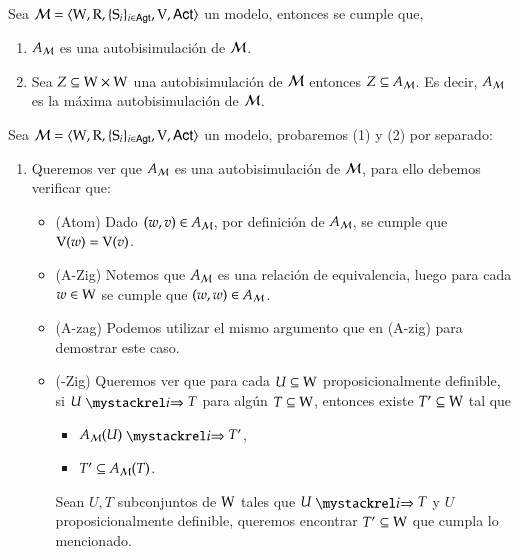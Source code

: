 \begin{teorema}
    Sea $\mathcal{M}=\langle \mathrm{W},\mathrm{R},\{ \mathrm{S}_i \}_{i \in {\rm \sf Agt}},\mathrm{V},{\rm \sf Act} \rangle$ un modelo, entonces se cumple que,
    \begin{enumerate}
        \item $A_{\mathcal{M}}$ es una autobisimulación de $\mathcal{M}$.
        \item Sea $Z \subseteq \mathrm{W} \times \mathrm{W}$ una autobisimulación de $\mathcal{M}$ entonces $Z \subseteq A_{\mathcal{M}}$. Es decir, $A_{\mathcal{M}} $ es la máxima autobisimulación de $\mathcal{M}$. 
    \end{enumerate}
\end{teorema}

\begin{demostracion}
    Sea $\mathcal{M}=\langle \mathrm{W},\mathrm{R},\{ \mathrm{S}_i \}_{i \in {\rm \sf Agt}},\mathrm{V},{\rm \sf Act} \rangle$ un modelo, probaremos (1) y (2) por separado:

    \begin{enumerate}
        \item Queremos ver que $A_{\mathcal{M}}$ es una autobisimulación de $\mathcal{M}$, para ello debemos verificar que:
        \begin{itemize}
            \item (Atom) Dado $(w,v) \in A_{\mathcal{M}}$, por definición de $A_{\mathcal{M}}$, se cumple que $\mathrm{V}(w) = \mathrm{V}(v)$.
            \item (A-Zig) Notemos que $A_{\mathcal{M}}$ es una relación de equivalencia, luego para cada $w\in \mathrm{W}$ se cumple que $(w,w) \in A_{\mathcal{M}}$.
            \item (A-zag) Podemos utilizar el mismo argumento que en (A-zig) para demostrar este caso.
            \item (\KHilogic-Zig) Queremos ver que para cada $U \subseteq \mathrm{W}$ proposicionalmente definible, si $U \ultsExecAgi T$ para algún $T \subseteq \mathrm{W}$, entonces existe $T' \subseteq \mathrm{W}$ tal que
                \begin{multicols}{2}
                    \begin{itemize}
                        \item $A_\modults(U) \ultsExecAgi T'$, 
                        \item $T' \subseteq A_{\mathcal{M}}(T)$.
                    \end{itemize}
                \end{multicols}

            Sean $U,T$ subconjuntos de $\mathrm{W}$ tales que $U \ultsExecAgi T$ y $U$ proposicionalmente definible, queremos encontrar $T' \subseteq \mathrm{W}$ que cumpla lo mencionado.


\end{itemize}
\end{enumerate}
\end{demostracion}
